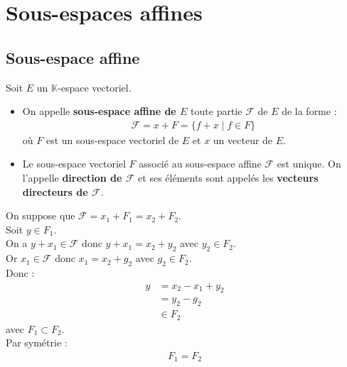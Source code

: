 \documentclass[../main.tex]{subfiles}
\begin{document}
\setcounter{chapter}{22}
\chapter{Sous-espaces affines}
\tableofcontents
\clearpage

\section{Sous-espace affine}
\begin{tcolorbox}[title=Définition, title filled=false, colframe=lightpurple, colback=lightpurple!10!white]
    Soit $E$ un $\mathbb{K}$-espace vectoriel. \\
    \begin{itemize}
        \item On appelle \textbf{sous-espace affine de $E$} toute partie $\mathcal{F}$ de $E$ de la forme : 
        \begin{align*}
            \mathcal{F} = x + F = \{f + x \mid f \in F\}
        \end{align*}
        où $F$ est un sous-espace vectoriel de $E$ et $x$ un vecteur de $E$. \\
        
        \item Le sous-espace vectoriel $F$ associé au sous-espace affine $\mathcal{F}$ est unique. On l'appelle \textbf{direction de $\mathcal{F}$} et ses éléments sont appelés les \textbf{vecteurs directeurs de $\mathcal{F}$}. 
    \end{itemize}
\end{tcolorbox}

\noindent On suppose que $\mathcal{F} = x_1 + F_1 = x_2 + F_2$. \\
Soit $y\in F_1$. \\
On a $y + x_1 \in \mathcal{F}$ donc $y + x_1 = x_2 + y_2$ avec $y_2 \in F_2$. \\
Or $x_1 \in \mathcal{F}$ donc $x_1 = x_2 + g_2$ avec $g_2 \in F_2$. \\
Donc : 
\begin{align*}
    y &= x_2 - x_1 + y_2 \\
    &= y_2 - g_2 \\
    &\in F_2
\end{align*}
avec $F_1 \subset F_2$. \\
Par symétrie : 
\begin{align*}
    F_1 = F_2
\end{align*}
\end{document}
